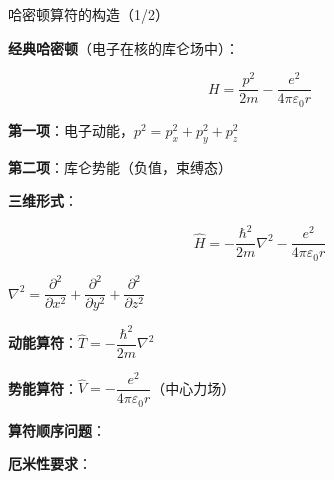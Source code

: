 \documentclass[aspectratio=169, 10pt]{beamer}
\begin{document}
\begin{frame}{哈密顿算符的构造（1/2）}
{    
  }{
    \begin{iqbitemize}
    \item \textbf{经典哈密顿}（电子在核的库仑场中）：
    \end{iqbitemize}
    \[
      H = \dfrac{p^2}{2m} - \dfrac{e^2}{4\pi\varepsilon_0 r}
    \]
    \begin{iqbitemize}
    \item \textbf{第一项}：电子动能，$p^2 = p_x^2 + p_y^2 + p_z^2$
    \item \textbf{第二项}：库仑势能（负值，束缚态）
    \end{iqbitemize}

    \iqbsmallsep

    \begin{iqbitemize}
    \item \textbf{三维形式}：
    \end{iqbitemize}
    \[
      \hat{H} = -\dfrac{\hbar^2}{2m}\nabla^2 - \dfrac{e^2}{4\pi\varepsilon_0 r}
    \]
    \begin{iqbitemize}
    \item $\nabla^2 = \dfrac{\partial^2}{\partial x^2} + \dfrac{\partial^2}{\partial y^2} + \dfrac{\partial^2}{\partial z^2}$
    \item \textbf{动能算符}：$\hat{T} = -\dfrac{\hbar^2}{2m}\nabla^2$
    \item \textbf{势能算符}：$\hat{V} = -\dfrac{e^2}{4\pi\varepsilon_0 r}$（中心力场）
    \end{iqbitemize}

    \iqbsep

    \begin{iqbitemize}
    \item \textbf{算符顺序问题}：

    \item \textbf{厄米性要求}：
    \end{iqbitemize}

  }
\end{frame}
\end{document}
